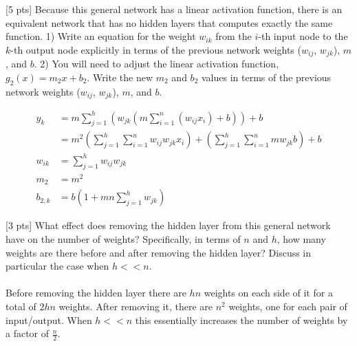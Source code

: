 \vspace{3mm}
\begin{question}{[5 pts]}
Because this general network has a linear activation function, there is an equivalent network that has no hidden layers that computes exactly the same function. 1) Write an equation for the weight $w_{ik}$ from the $i$-th input node to the $k$-th output node explicitly in terms of the previous network weights ($w_{ij}$, $w_{jk}$), $m$, and $b$. 2) You will need to adjust the linear activation function, $g_2(x) = m_2x + b_2$. Write the new $m_2$ and $b_2$ values in terms of the previous network weights ($w_{ij}$, $w_{jk}$), $m$, and $b$.

\begin{minipage}{\textwidth}
    \solution{} {\begin{align*}
    y_k &= m\sum_{j=1}^h(w_{jk}(m\sum_{i=1}^n(w_{ij}x_i)+b))+b\\
    &= m^2\left(\sum_{j=1}^h\sum_{i=1}^n w_{ij}w_{jk}x_i\right) + \left(\sum_{j=1}^h\sum_{i=1}^n mw_{jk}b\right) + b\\
    w_{ik} &= \sum_{j=1}^h w_{ij}w_{jk}\\
    m_2 &= m^2\\
    b_{2,k} &= b\left(1+mn\sum_{j=1}^h w_{jk}\right)
    \end{align*}
    }
\end{minipage}
\end{question}

\begin{question}{[3 pts]}
What effect does removing the hidden layer from this general network have on the number of weights? Specifically, in terms of $n$ and $h$, how many weights are there before and after removing the hidden layer? Discuss in particular the case when $h << n$.

\begin{minipage}{\textwidth}
    \solution{} {
    \paragraph{} Before removing the hidden layer there are $hn$ weights on each side of it for a total of $2hn$ weights. After removing it, there are $n^2$ weights, one for each pair of input/output. When $h<<n$ this essentially increases the number of weights by a factor of $\frac n2$.
    }
\end{minipage}

\end{question}





